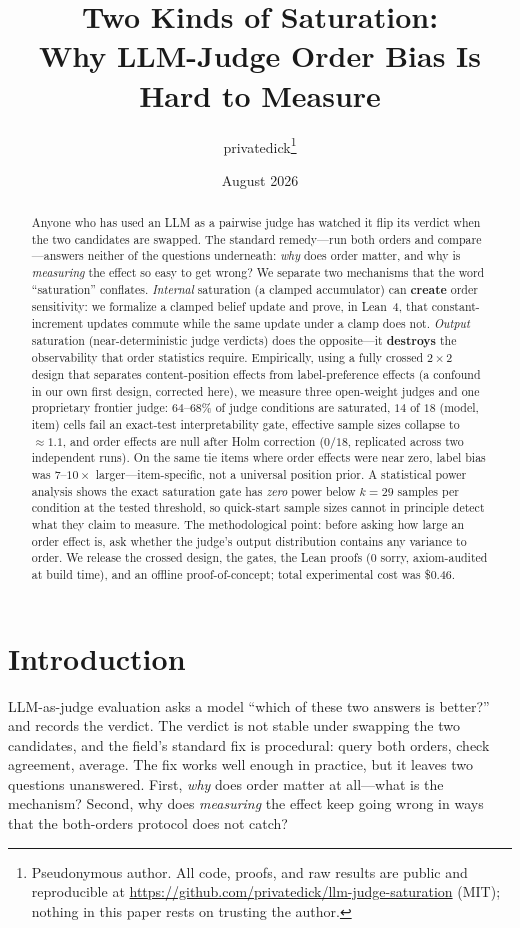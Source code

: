 \documentclass[11pt]{article}
\title{Two Kinds of Saturation:\\ Why LLM-Judge Order Bias Is Hard to Measure}
\author{privatedick\thanks{Pseudonymous author. All code, proofs, and raw
results are public and reproducible at
\url{https://github.com/privatedick/llm-judge-saturation} (MIT); nothing in
this paper rests on trusting the author.}}
\date{August 2026}
\begin{document}
\maketitle

\begin{abstract}
Anyone who has used an LLM as a pairwise judge has watched it flip its
verdict when the two candidates are swapped. The standard remedy---run both
orders and compare---answers neither of the questions underneath: \emph{why}
does order matter, and why is \emph{measuring} the effect so easy to get
wrong? We separate two mechanisms that the word ``saturation'' conflates.
\emph{Internal} saturation (a clamped accumulator) can \textbf{create} order
sensitivity: we formalize a clamped belief update and prove, in Lean~4, that
constant-increment updates commute while the same update under a clamp does
not. \emph{Output} saturation (near-deterministic judge verdicts) does the
opposite---it \textbf{destroys} the observability that order statistics
require. Empirically, using a fully crossed $2\times2$ design that separates
content-position effects from label-preference effects (a confound in our own
first design, corrected here), we measure three open-weight judges and one
proprietary frontier judge: $64$--$68\%$ of judge conditions are saturated,
$14$ of $18$ (model, item) cells fail an exact-test interpretability gate,
effective sample sizes collapse to ${\approx}1.1$, and order effects are null
after Holm correction ($0/18$, replicated across two independent runs). On
the same tie items where order effects were near zero, label bias was
$7$--$10\times$ larger---item-specific, not a universal position prior. A
statistical power analysis shows the exact saturation gate has \emph{zero}
power below $k{=}29$ samples per condition at the tested threshold, so
quick-start sample sizes cannot in principle detect what they claim to
measure. The methodological point: before asking how large an order effect
is, ask whether the judge's output distribution contains any variance to
order. We release the crossed design, the gates, the Lean proofs (0 sorry,
axiom-audited at build time), and an offline proof-of-concept; total
experimental cost was \$0.46.
\end{abstract}

\section{Introduction}

LLM-as-judge evaluation asks a model ``which of these two answers is
better?'' and records the verdict. The verdict is not stable under swapping
the two candidates, and the field's standard fix is procedural: query both
orders, check agreement, average. The fix works well enough in practice, but
it leaves two questions unanswered. First, \emph{why} does order matter at
all---what is the mechanism? Second, why does \emph{measuring} the effect
keep going wrong in ways that the both-orders protocol does not catch?
\end{document}
